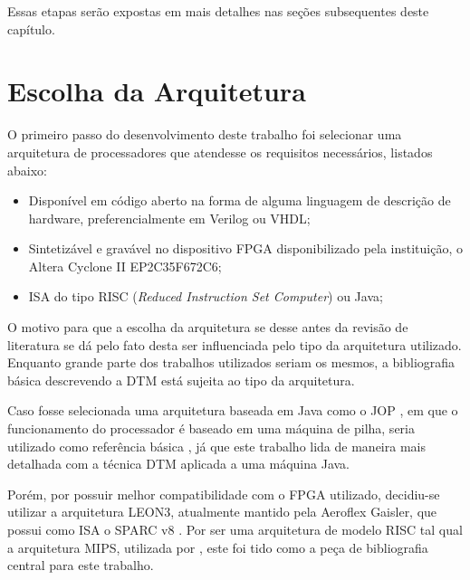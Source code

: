 Essas etapas serão expostas em mais detalhes nas seções subsequentes deste capítulo.

\section{Escolha da Arquitetura} 
\label{Metodologia:Arquitetura}

O primeiro passo do desenvolvimento deste trabalho foi selecionar uma arquitetura de processadores que atendesse os requisitos necessários, listados abaixo:

\begin{itemize}
	
	\item Disponível em código aberto na forma de alguma linguagem de descrição de hardware, preferencialmente em Verilog ou VHDL;
	
	\item Sintetizável e gravável no dispositivo FPGA disponibilizado pela instituição, o Altera Cyclone II EP2C35F672C6;
	
	\item ISA do tipo RISC (\textit{Reduced Instruction Set Computer}) ou Java;
	
	
\end{itemize}

O motivo para que a escolha da arquitetura se desse antes da revisão de literatura se dá pelo fato desta ser influenciada pelo tipo da arquitetura utilizado. Enquanto grande parte dos trabalhos utilizados seriam os mesmos, a bibliografia básica descrevendo a DTM está sujeita ao tipo da arquitetura.

Caso fosse selecionada uma arquitetura baseada em Java como o JOP \cite{schoeberl2005jop}, em que o funcionamento do processador é baseado em uma máquina de pilha, seria utilizado como referência básica , já que este trabalho lida de maneira mais detalhada com a técnica DTM aplicada a uma máquina Java.

Porém, por possuir melhor compatibilidade com o FPGA utilizado, decidiu-se utilizar a arquitetura LEON3, atualmente mantido pela Aeroflex Gaisler, que possui como ISA o SPARC v8 \cite{gaisler2010leon3}. Por ser uma arquitetura de modelo RISC tal qual a arquitetura MIPS, utilizada por , este foi tido como a peça de bibliografia central para este trabalho.


